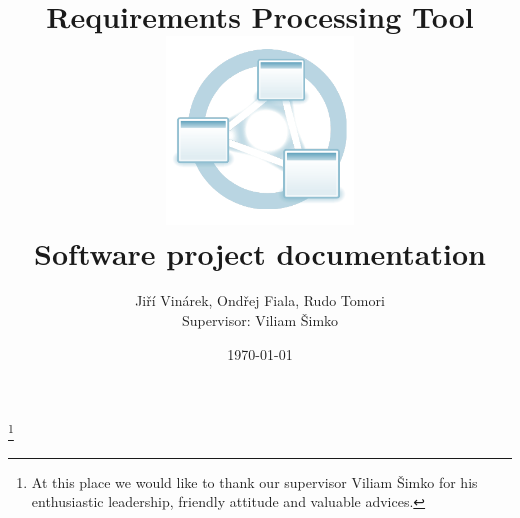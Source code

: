 \documentclass[12pt,a4paper]{article}
\title{
  \textbf{Requirements Processing Tool}\\
  \vspace{26pt}\includegraphics[height=5cm]{images/reprotool-logo}\\
  \vspace{16pt}\textbf{Software project documentation}
}
\author{
  Jiří Vinárek,
  Ondřej Fiala,
  Rudo Tomori
  \vspace*{120pt}
  \\Supervisor: Viliam Šimko
}
\date{\small{\today}}
\begin{document}
\maketitle
\thispagestyle{empty} %

\newpage

\thanks{At this place we would like to thank our supervisor Viliam Šimko for his enthusiastic leadership, friendly attitude and valuable advices.}

\newpage

\tableofcontents
\vspace{12pt}

  
  
  
  
  
  
  \appendix
  
%  



\end{document}
